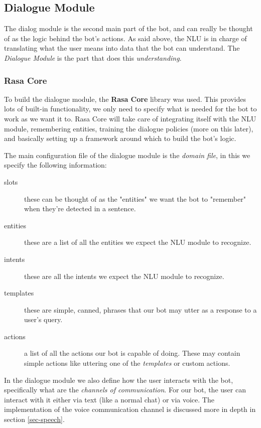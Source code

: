 \documentclass[11pt,a4paper]{article}
\begin{document}
	\subsection{Dialogue Module}
	\label{ssec-dialogue-module}
		
		The dialog module is the second main part of the bot, and can really be thought of as the logic behind the bot's actions. As said above, the NLU is in charge of translating what the user means into data that the bot can understand. The \textit{Dialogue Module} is the part that does this \textit{understanding}.
		
		
		\subsubsection{Rasa Core}
		\label{ssec-rasa-core}	
		
			To build the dialogue module, the \textbf{Rasa Core} \cite{rasacore} library was used. This provides lots of built-in functionality, we only need to specify what is needed for the bot to work as we want it to. Rasa Core will take care of integrating itself with the NLU module, remembering entities, training the dialogue policies (more on this later), and basically setting up a framework around which to build the bot's logic. 
			
			The main configuration file of the dialogue module is the \textit{domain file}, in this we specify the following information:
			
			\begin{description}
				\item[slots] these can be thought of as the "entities" we want the bot to "remember" when they're detected in a sentence.
				\item[entities] these are a list of all the entities we expect the NLU module to recognize.
				\item[intents] these are all the intents we expect the NLU module to recognize.
				\item[templates] these are simple, canned, phrases that our bot may utter as a response to a user's query.
				\item[actions] a list of all the actions our bot is capable of doing. These may contain simple actions like uttering one of the \textit{templates} or custom actions.
			\end{description}
			
			In the dialogue module we also define how the user interacts with the bot, specifically what are the \textit{channels of communication}. For our bot, the user can interact with it either via text (like a normal chat) or via voice. The implementation of the voice communication channel is discussed more in depth in section \ref{sec-speech}.
			
\end{document}
